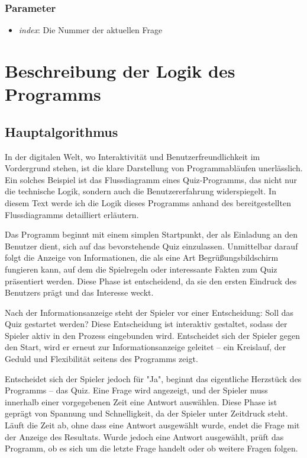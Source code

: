 \documentclass[10pt, fleqn]{scrartcl}
\begin{document}
\subsubsection*{Parameter}
\begin{itemize}
	\item \textit{index}: Die Nummer der aktuellen Frage
\end{itemize}


\newpage

\section{Beschreibung der Logik des Programms}

\subsection{Hauptalgorithmus}

In der digitalen Welt, wo Interaktivität und Benutzerfreundlichkeit im Vordergrund stehen, ist die klare Darstellung von Programmabläufen unerlässlich. Ein solches Beispiel ist das Flussdiagramm eines Quiz-Programms, das nicht nur die technische Logik, sondern auch die Benutzererfahrung widerspiegelt. In diesem Text werde ich die Logik dieses Programms anhand des bereitgestellten Flussdiagramms detailliert erläutern.

Das Programm beginnt mit einem simplen Startpunkt, der als Einladung an den Benutzer dient, sich auf das bevorstehende Quiz einzulassen. Unmittelbar darauf folgt die Anzeige von Informationen, die als eine Art Begrüßungsbildschirm fungieren kann, auf dem die Spielregeln oder interessante Fakten zum Quiz präsentiert werden. Diese Phase ist entscheidend, da sie den ersten Eindruck des Benutzers prägt und das Interesse weckt.

Nach der Informationsanzeige steht der Spieler vor einer Entscheidung: Soll das Quiz gestartet werden? Diese Entscheidung ist interaktiv gestaltet, sodass der Spieler aktiv in den Prozess eingebunden wird. Entscheidet sich der Spieler gegen den Start, wird er erneut zur Informationsanzeige geleitet – ein Kreislauf, der Geduld und Flexibilität seitens des Programms zeigt.

Entscheidet sich der Spieler jedoch für "Ja", beginnt das eigentliche Herzstück des Programms – das Quiz. Eine Frage wird angezeigt, und der Spieler muss innerhalb einer vorgegebenen Zeit eine Antwort auswählen. Diese Phase ist geprägt von Spannung und Schnelligkeit, da der Spieler unter Zeitdruck steht. Läuft die Zeit ab, ohne dass eine Antwort ausgewählt wurde, endet die Frage mit der Anzeige des Resultats. Wurde jedoch eine Antwort ausgewählt, prüft das Programm, ob es sich um die letzte Frage handelt oder ob weitere Fragen folgen.
\end{document}
